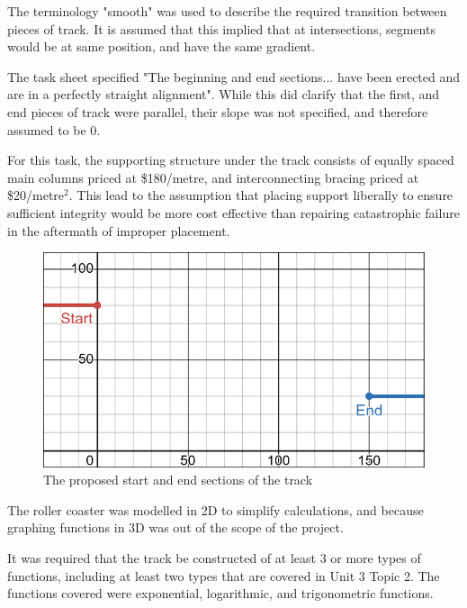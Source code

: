\documentclass[11pt, letterpaper]{article}
\begin{document}
The terminology "smooth" was used to describe the required transition between pieces of track. It is assumed that this implied that at intersections, segments would be at same position, and have the same gradient.

The task sheet specified "The beginning and end sections... have been erected and are in a perfectly straight alignment". While this did clarify that the first, and end pieces of track were parallel, their slope was not specified, and therefore assumed to be 0.

For this task, the supporting structure under the track consists of equally spaced main columns priced at \$180/metre, and interconnecting bracing priced at \$20/metre$^2$. This lead to the assumption that placing support liberally to ensure sufficient integrity would be more cost effective than repairing catastrophic failure in the aftermath of improper placement.






		\begin{figure}[h]
	
	\begin{center}
		\includegraphics[width=15cm]{Start and End.png}
		
		\caption{The proposed start and end sections of the track}
	\end{center}
	
	
\end{figure}



The roller coaster was modelled in 2D to simplify calculations, and because graphing functions in 3D was out of the scope of the project. 


		
It was required that the track be constructed of at least 3 or more types of functions, including at least two types that are covered in Unit 3 Topic 2. The functions covered were exponential, logarithmic, and trigonometric functions.
	
\end{document}
